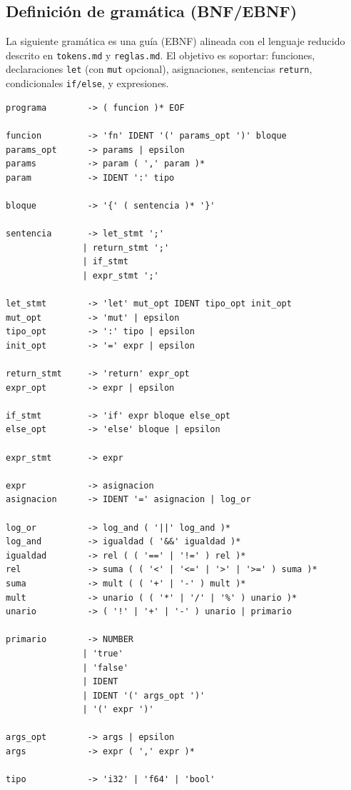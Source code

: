 \documentclass[12pt]{article}
\begin{document}
\subsection{Definición de gramática (BNF/EBNF)}
La siguiente gramática es una guía (EBNF) alineada con el lenguaje reducido descrito en \texttt{tokens.md} y \texttt{reglas.md}. El objetivo es soportar: funciones, declaraciones \texttt{let} (con \texttt{mut} opcional), asignaciones, sentencias \texttt{return}, condicionales \texttt{if/else}, y expresiones.

\begin{verbatim}
programa        -> ( funcion )* EOF

funcion         -> 'fn' IDENT '(' params_opt ')' bloque
params_opt      -> params | epsilon
params          -> param ( ',' param )*
param           -> IDENT ':' tipo

bloque          -> '{' ( sentencia )* '}'

sentencia       -> let_stmt ';'
               | return_stmt ';'
               | if_stmt
               | expr_stmt ';'

let_stmt        -> 'let' mut_opt IDENT tipo_opt init_opt
mut_opt         -> 'mut' | epsilon
tipo_opt        -> ':' tipo | epsilon
init_opt        -> '=' expr | epsilon

return_stmt     -> 'return' expr_opt
expr_opt        -> expr | epsilon

if_stmt         -> 'if' expr bloque else_opt
else_opt        -> 'else' bloque | epsilon

expr_stmt       -> expr

expr            -> asignacion
asignacion      -> IDENT '=' asignacion | log_or

log_or          -> log_and ( '||' log_and )*
log_and         -> igualdad ( '&&' igualdad )*
igualdad        -> rel ( ( '==' | '!=' ) rel )*
rel             -> suma ( ( '<' | '<=' | '>' | '>=' ) suma )*
suma            -> mult ( ( '+' | '-' ) mult )*
mult            -> unario ( ( '*' | '/' | '%' ) unario )*
unario          -> ( '!' | '+' | '-' ) unario | primario

primario        -> NUMBER
               | 'true'
               | 'false'
               | IDENT
               | IDENT '(' args_opt ')'
               | '(' expr ')'

args_opt        -> args | epsilon
args            -> expr ( ',' expr )*

tipo            -> 'i32' | 'f64' | 'bool'
\end{verbatim}
\end{document}
